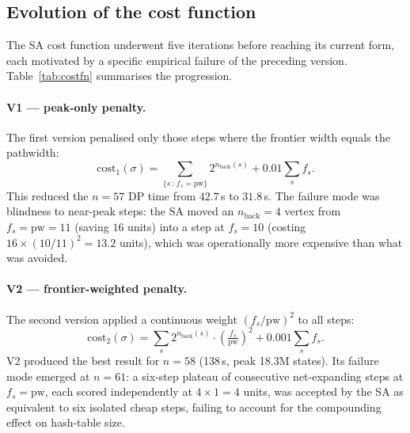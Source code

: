 \documentclass[12pt]{article}
\theoremstyle{definition}
\newcommand{\pw}{\mathrm{pw}}
\newcommand{\nb}{n_{\mathrm{back}}}
\begin{document}
\subsection{Evolution of the cost function}
\label{sec:costfn-evolution}

The SA cost function underwent five iterations before reaching its current
form, each motivated by a specific empirical failure of the preceding version.
Table~\ref{tab:costfn} summarises the progression.

\paragraph{V1 — peak-only penalty.}
The first version penalised only those steps where the frontier width
equals the pathwidth:
\[
  \mathrm{cost}_1(\sigma)
    = \sum_{\{s\,:\,f_s = \pw\}} 2^{\nb(s)}
      + 0.01 \sum_s f_s.
\]
This reduced the $n=57$ DP time from $42.7$\,s to $31.8$\,s.
The failure mode was blindness to near-peak steps: the SA moved an
$\nb=4$ vertex from $f_s = \pw = 11$ (saving $16$ units) into a step
at $f_s = 10$ (costing $16 \times (10/11)^2 = 13.2$ units), which was
operationally more expensive than what was avoided.

\paragraph{V2 — frontier-weighted penalty.}
The second version applied a continuous weight $(f_s/\pw)^2$ to all
steps:
\[
  \mathrm{cost}_2(\sigma)
    = \sum_s 2^{\nb(s)} \cdot \!\left(\tfrac{f_s}{\pw}\right)^{\!2}
      + 0.001 \sum_s f_s.
\]
V2 produced the best result for $n=58$ (138\,s, peak 18.3M states).
Its failure mode emerged at $n=61$: a six-step plateau of consecutive
net-expanding steps at $f_s = \pw$, each scored independently at
$4 \times 1 = 4$ units, was accepted by the SA as equivalent to six
isolated cheap steps, failing to account for the compounding effect on
hash-table size.
\end{document}
